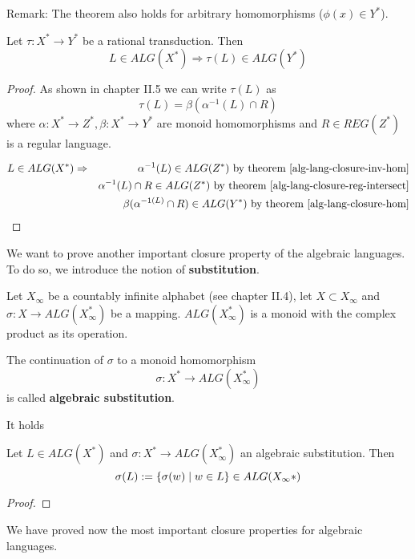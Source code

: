 Remark: The theorem also holds for arbitrary homomorphisms ($\phi(x) \in Y^*$).

\begin{corollary}
Let $\tau: X^* \to Y^*$ be a rational transduction. Then
\[ L\in ALG(X^*)\Rightarrow \tau(L)\in ALG(Y^*) \]
\end{corollary}

\begin{proof}
As shown in chapter II.5 we can write $\tau(L)$ as
\[ \tau(L)=\beta(\alpha^{-1}(L)\cap R) \]
where $\alpha : X^*\to Z^*, \beta: X^*\to Y^*$ are monoid homomorphisms and
$R\in REG(Z^*)$ is a regular language.

\begin{eqnarray*}
L\in ALG(X^*) &\Rightarrow& \alpha^{-1}(L)\in ALG(Z^*)\text{ by theorem
\ref{alg-lang-closure-inv-hom}}\\
&& \alpha^{-1}(L)\cap R\in ALG(Z^*)\text{ by theorem
\ref{alg-lang-closure-reg-intersect}}\\
&& \beta(\alpha^{-1(L)}\cap R)\in ALG(Y^*)\text{ by theorem
\ref{alg-lang-closure-hom}}
\end{eqnarray*}
\end{proof}

\bigskip
We want to prove another important closure property of the algebraic languages.
To do so, we introduce the notion of {\bf substitution}.

\begin{definition}
Let $X_\infty$ be a countably infinite alphabet (see chapter II.4), let $X
\subset X_\infty$ and $\sigma:X\to ALG(X_\infty^*)$ be a mapping.
$ALG(X_\infty^*)$ is a monoid with the complex product as its operation.

The continuation of $\sigma$ to a monoid homomorphism 
\[ \sigma: X^*\to ALG(X_\infty^*) \]
is called {\bf algebraic substitution}.
\end{definition}

It holds
\begin{theorem}
Let $L\in ALG(X^*)$ and $\sigma: X^*\to ALG(X_\infty^*)$ an algebraic
substitution. Then
\[ \sigma(L) := \mbox{$\{\sigma(w)\mid w\in L\}$} \in ALG(X_\infty*) \]
\end{theorem}

\begin{proof}

\end{proof}

\bigskip
We have proved now the most important closure properties for algebraic
languages.

